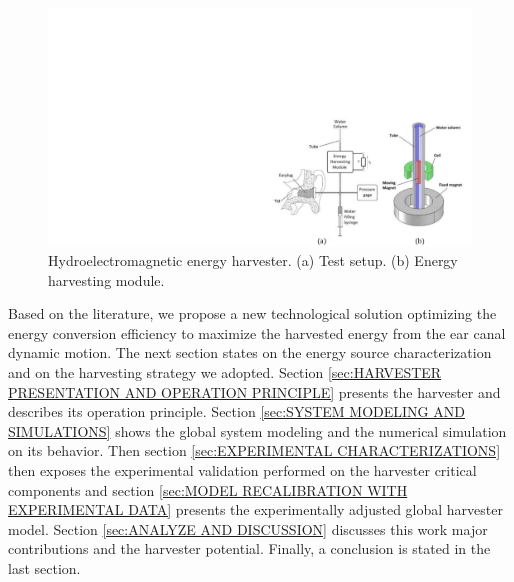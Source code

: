 \documentclass[3p,twocolumn,preprint]{elsarticle}
\begin{document}
\begin{figure}[!htbp]
	\centering
	\captionsetup{justification=centering}
	\includegraphics[trim={18cm 0cm 0cm 8.75cm},clip, width=\linewidth]{figures/critias_emag.pdf}
	\caption{Hydroelectromagnetic energy harvester. (a) Test setup. (b) Energy harvesting module. \cite{Delnavaz2012}} 
	\label{fig:critias_emag}
\end{figure}
\begin{table}[!htbp]
	\centering
	\captionsetup{justification=centering}
	\caption{Existing harvesters exploiting the ear canal deformation energy}
	\label{tab:harvesters_ear}
\end{table}
Based on the literature, we propose a new technological solution optimizing the energy conversion efficiency to maximize the harvested energy from the ear canal dynamic motion. The next section states on the energy source characterization and on the harvesting strategy we adopted. Section \ref{sec:HARVESTER PRESENTATION AND OPERATION PRINCIPLE} presents the harvester and describes its operation principle. Section \ref{sec:SYSTEM MODELING AND SIMULATIONS} shows the global system  modeling and the numerical simulation on its behavior. Then section \ref{sec:EXPERIMENTAL CHARACTERIZATIONS} then exposes the experimental validation performed on the harvester critical components and section \ref{sec:MODEL RECALIBRATION WITH EXPERIMENTAL DATA} presents the experimentally adjusted global harvester model. Section \ref{sec:ANALYZE AND DISCUSSION} discusses this work major contributions and the harvester potential. Finally, a conclusion is stated in the last section.
\end{document}
